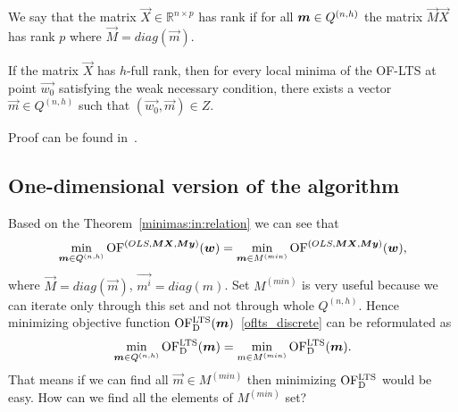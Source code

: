       


 







We say that the matrix $\vec{X} \in \mathbb{R}^{n \times p}$ has  rank if for all $\boldsymbol{m} \in Q^{(n,h)}$ the matrix $\vec{M}\vec{X}$ has rank $p$ where $\vec{M} = diag(\vec{m})$.

\begin{theorem} \label{minimas:in:relation}
    If the matrix $\vec{X}$ has $h$-full rank, then for every local minima of the OF-LTS at point $\vec{w_{0}}$ satisfying the weak necessary condition, there exists a vector $\vec{m} \in Q^{(n,h)}$ such that $(\vec{w_{0}}, \vec{m}) \in Z$.
\end{theorem}
Proof can be found in~\cite[Theorem~7]{klouda2015exact}. 

\subsection{ One-dimensional version of the algorithm}

Based on the Theorem~\ref{minimas:in:relation} we can see that
\begin{equation}
    \operatorname*{min}_{\boldsymbol{m} \in Q^{(n,h)}} \operatorname{OF}^{(OLS,\boldsymbol{M}\boldsymbol{X}, \boldsymbol{M}\boldsymbol{y})} (\boldsymbol{w}) =
    \operatorname*{min}_{ \boldsymbol{m} \in M^{(min)}} \operatorname{OF}^{(OLS,\boldsymbol{M}\boldsymbol{X}, \boldsymbol{M}\boldsymbol{y})} (\boldsymbol{w}),
\end{equation}
where $\vec{M} = diag(\vec{m})$, $\vec{m^i} = diag(m)$. Set $M^{(min)}$ is very useful because we can iterate only through this set and not through whole $Q^{(n,h)}$. Hence minimizing objective function $\operatorname{OF^{LTS}_D}(\boldsymbol{m})$~\eqref{oflts_discrete} can be reformulated as 
\begin{equation} \label{mminqnh}
    \operatorname*{min}_{\boldsymbol{m} \in Q^{(n,h)}}  \operatorname{OF^{LTS}_D}(\boldsymbol{m}) = \operatorname*{min}_{m \in M^{(min)}} \operatorname{OF^{LTS}_D}(\boldsymbol{m}).
\end{equation}
That means if we can find all $\vec{m} \in M^{(min)}$ then minimizing $\operatorname{OF^{LTS}_D}$ would be easy.
How can we find all the elements of $M^{(min)}$ set? 

